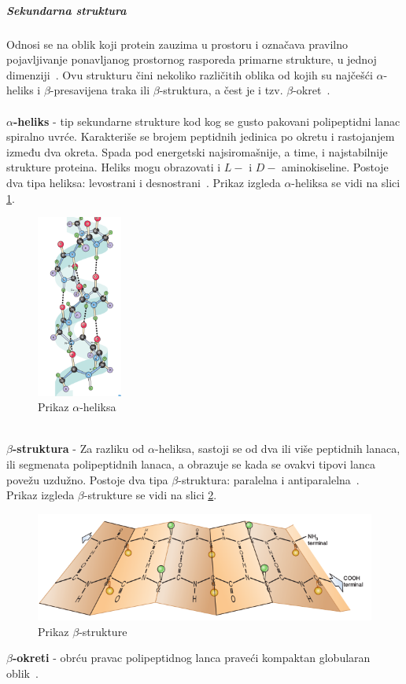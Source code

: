 \subparagraph{Sekundarna struktura}
Odnosi se na oblik koji protein zauzima u prostoru i označava pravilno pojavljivanje ponavljanog prostornog rasporeda primarne strukture, u jednoj dimenziji~\cite{medbio}.
Ovu strukturu čini nekoliko različitih oblika od kojih su najčešći $\alpha$-heliks i $\beta$-presavijena traka ili $\beta$-struktura, a čest je i tzv. $\beta$-okret~\cite{spasic}.\\\\
\textbf{$\alpha$-heliks} - tip sekundarne strukture kod kog se gusto pakovani polipeptidni lanac spiralno uvrće. Karakteriše se brojem peptidnih jedinica po okretu i rastojanjem između dva okreta. Spada pod energetski najsiromašnije, a time, i najstabilnije strukture proteina. Heliks mogu obrazovati i $L-$ i $D-$ aminokiseline. Postoje dva tipa heliksa: levostrani i desnostrani~\cite{spasic}. Prikaz izgleda $\alpha$-heliksa se vidi na slici \ref{fig:aheliks}.
\begin{figure}[h]
	\centering
    \includegraphics[width=0.25\textwidth]{Figures/BO/ahelix.png}
    \caption{Prikaz $\alpha$-heliksa~\cite{bmbg}}
    \label{fig:aheliks}
\end{figure}
 \\
\textbf{$\beta$-struktura} - Za razliku od $\alpha$-heliksa, sastoji se od dva ili više peptidnih lanaca, ili segmenata polipeptidnih lanaca, a obrazuje se kada se ovakvi tipovi lanca povežu uzdužno. Postoje dva tipa $\beta$-struktura: paralelna i antiparalelna~\cite{spasic}.\\
Prikaz izgleda $\beta$-strukture se vidi na slici \ref{fig:beta}.
\begin{figure}[h]
	\centering
    \includegraphics[width=1\textwidth]{Figures/BO/beta.png}
    \caption{Prikaz $\beta$-strukture~\cite{bmbg}}
    \label{fig:beta}
\end{figure}
\textbf{$\beta$-okreti} - obrću pravac polipeptidnog lanca praveći kompaktan globularan oblik~\cite{lippincott}. 
 

